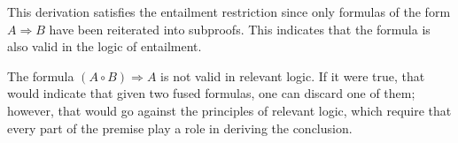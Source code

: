 \documentclass{article}
\begin{document}
This derivation satisfies the entailment restriction since only formulas of the form $A \Rightarrow B$ have been reiterated into subproofs. This indicates that the formula is also valid in the logic of entailment.

The formula $(A \circ B) \Rightarrow A$ is not valid in relevant logic. If it were true, that would indicate that given two fused formulas, one can discard one of them; however, that would go against the principles of relevant logic, which require that every part of the premise play a role in deriving the conclusion.
\end{document}
